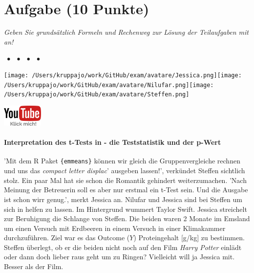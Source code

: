 \documentclass[a4paper, 9pt]{scrartcl}\usepackage[]{graphicx}\usepackage[]{xcolor}
\begin{document}
\section{Aufgabe \hfill (10 Punkte)}

\textit{Geben Sie grundsätzlich Formeln und Rechenweg zur Lösung der Teilaufgaben mit an!} \\[1Ex]
 

 
\ifcollection
\begin{flushright}
\tiny\vspace{-3Ex}
\textbf{\examinhaltstart}
\exammodulemathstat $\;\bullet$
\exammodulestat $\;\bullet$
\exammodulestatbbv $\;\bullet$
\exammodulestatversuch $\;\bullet$
\exammodulebiostat
\vspace{-4Ex}
\end{flushright}
\begin{minipage}[t]{0.5\textwidth}
\texttt{[image: /Users/kruppajo/work/GitHub/exam/avatare/Jessica.png]}\hspace{-4mm}\texttt{[image: /Users/kruppajo/work/GitHub/exam/avatare/Nilufar.png]}\hspace{-4mm}\texttt{[image: /Users/kruppajo/work/GitHub/exam/avatare/Steffen.png]}
\end{minipage}
\begin{minipage}[t]{0.5\textwidth}
\hfill
\href{https://youtu.be/exDo7AyHl4Q}{\includegraphics[width = 2cm]{img/youtube}}
\end{minipage}
\fi



\ifcollection
\paragraph{Interpretation des t-Tests in \Rlogo - die Teststatistik und der p-Wert}
\fi

'Mit dem R Paket \texttt{\{emmeans\}} können wir gleich die Gruppenvergleiche rechnen und uns das \textit{compact letter displac}' ausgeben lassen!', verkündet Steffen sichtlich stolz. Ein paar Mal hat sie schon die Romantik gehindert weiterzumachen. 'Nach Meinung der Betreuerin soll es aber nur erstmal ein t-Test sein. Und die Ausgabe ist schon wirr genug.', merkt Jessica an. Nilufar und Jessica sind bei Steffen um sich in \Rlogo helfen zu lassen. Im Hintergrund wummert Taylor Swift. Jessica streichelt zur Beruhigung die Schlange von Steffen. Die beiden waren 2 Monate im Emsland um einen Versuch mit Erdbeeren in einem Versuch in einer Klimakammer durchzuführen. Ziel war es das Outcome ($Y$) Proteingehalt [g/kg] zu bestimmen. Steffen überlegt, ob er die beiden nicht noch auf den Film \textit{Harry Potter} einlädt oder dann doch lieber raus geht um zu Ringen? Vielleicht will ja Jessica mit. Besser als der Film.
\end{document}
